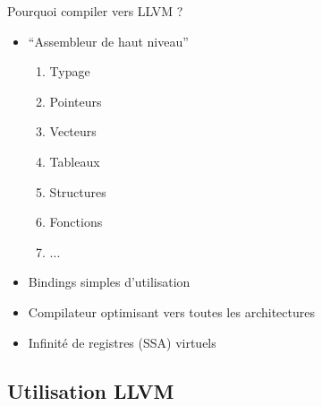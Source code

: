 \documentclass{beamer} %
\begin{document}
\begin{frame}{Pourquoi compiler vers LLVM ?}
    \vfill
    \begin{itemize}
        \item “Assembleur de haut niveau”
        \begin{enumerate}
            \item Typage
            \item Pointeurs
            \item Vecteurs
            \item Tableaux
            \item Structures
            \item Fonctions
            \item ...
        \end{enumerate}
    \vfill \item Bindings simples d'utilisation
    \vfill \item Compilateur optimisant vers toutes les architectures
    \vfill \item Infinité de registres (SSA) virtuels
    \end{itemize}
    \vfill
\end{frame}

\subsection{Utilisation LLVM}
\end{document}

